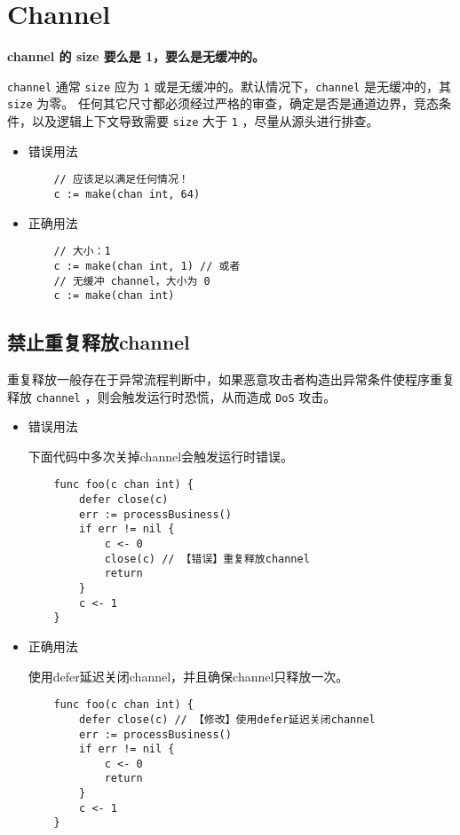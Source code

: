 \chapter{Channel}
\textbf{channel 的 size 要么是 1，要么是无缓冲的。}

\texttt{channel} 通常 \texttt{size} 应为 \texttt{1} 或是无缓冲的。默认情况下，\texttt{channel} 是无缓冲的，其 \texttt{size} 为零。
任何其它尺寸都必须经过严格的审查，确定是否是通道边界，竞态条件，以及逻辑上下文导致需要 \texttt{size} 大于 \texttt{1} ，尽量从源头进行排查。
\begin{itemize}[leftmargin=4em]
\item 错误用法

  \begin{verbatim}
    // 应该足以满足任何情况！
    c := make(chan int, 64)
  \end{verbatim}
\item 正确用法

  \begin{verbatim}
    // 大小：1
    c := make(chan int, 1) // 或者
    // 无缓冲 channel，大小为 0
    c := make(chan int)
  \end{verbatim}
\end{itemize}

\section{禁止重复释放channel}
重复释放一般存在于异常流程判断中，如果恶意攻击者构造出异常条件使程序重复释放 \texttt{channel} ，则会触发运行时恐慌，从而造成 \texttt{DoS} 攻击。

\begin{itemize}[leftmargin=4em]
\item 错误用法

  下面代码中多次关掉channel会触发运行时错误。
  \begin{verbatim}
    func foo(c chan int) {
    	defer close(c)
    	err := processBusiness()
    	if err != nil {
    		c <- 0
    		close(c) // 【错误】重复释放channel
    		return
    	}
    	c <- 1
    }
  \end{verbatim}
\item 正确用法

  使用defer延迟关闭channel，并且确保channel只释放一次。
  \begin{verbatim}
    func foo(c chan int) {
    	defer close(c) // 【修改】使用defer延迟关闭channel
    	err := processBusiness()
    	if err != nil {
    		c <- 0
    		return
    	}
    	c <- 1
    }
  \end{verbatim}
\end{itemize}
